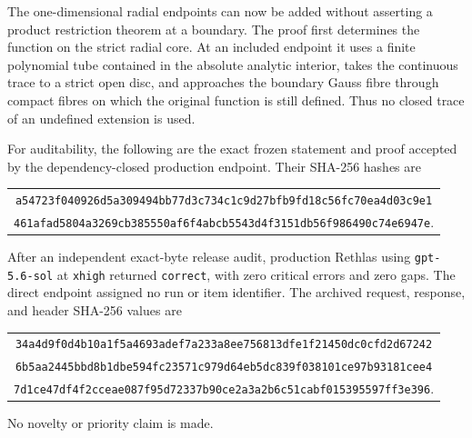 \begingroup
\providecommand{\an}{\mathrm{an}}


\endgroup

The one-dimensional radial endpoints can now be added without asserting a
product restriction theorem at a boundary.  The proof first determines the
function on the strict radial core.  At an included endpoint it uses a
finite polynomial tube contained in the absolute analytic interior, takes
the continuous trace to a strict open disc, and approaches the boundary
Gauss fibre through compact fibres on which the original function is still
defined.  Thus no closed trace of an undefined extension is used.

For auditability, the following are the exact frozen statement and proof
accepted by the dependency-closed production endpoint.  Their SHA-256
hashes are
\begin{center}
\small
\begin{tabular}{@{}c@{}}
\nolinkurl{a54723f040926d5a309494bb77d3c734c1c9d27bfb9fd18c56fc70ea4d03c9e1}\\
\nolinkurl{461afad5804a3269cb385550af6f4abcb5543d4f3151db56f986490c74e6947e}.
\end{tabular}
\end{center}
After an independent exact-byte release audit, production Rethlas using
\texttt{gpt-5.6-sol} at \texttt{xhigh} returned \texttt{correct}, with zero
critical errors and zero gaps.  The direct endpoint assigned no run or item
identifier.  The archived request, response, and header SHA-256 values are
\begin{center}
\small
\begin{tabular}{@{}c@{}}
\nolinkurl{34a4d9f0d4b10a1f5a4693adef7a233a8ee756813dfe1f21450dc0cfd2d67242}\\
\nolinkurl{6b5aa2445bbd8b1dbe594fc23571c979d64eb5dc839f038101ce97b93181cee4}\\
\nolinkurl{7d1ce47df4f2cceae087f95d72337b90ce2a3a2b6c51cabf015395597ff3e396}.
\end{tabular}
\end{center}
No novelty or priority claim is made.





